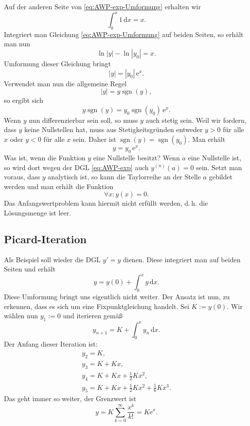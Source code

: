 \documentclass[a4paper,10pt,fleqn,twocolumn,twoside,openany]{article}
\numberwithin{equation}{section}
\newcommand{\ee}{\mathrm e}
\DeclareMathOperator*{\sgn}{sgn}
\theoremstyle{definition}
\begin{document}
Auf der anderen Seite von \eqref{eq:AWP-exp-Umformung} erhalten wir
\begin{equation}
\int_0^x 1\,\mathrm dx = x.
\end{equation}
Integriert man Gleichung \eqref{eq:AWP-exp-Umformung} auf beiden
Seiten, so erhält man nun
\begin{equation}
\ln|y|-\ln|y_0| = x.
\end{equation}
Umformung dieser Gleichung bringt
\begin{equation}
|y| = |y_0|\,\ee^x.
\end{equation}
Verwendet man nun die allgemeine Regel
\begin{equation}
|y|=y\sgn(y),
\end{equation}
so ergibt sich
\begin{equation}
y\sgn(y) = y_0\sgn(y_0)\,\ee^x.
\end{equation}
Wenn $y$ nun differenzierbar sein soll, so muss $y$ auch stetig sein.
Weil wir fordern, dass $y$ keine Nullstellen hat, muss aus
Stetigkeitsgründen entweder $y>0$ für alle $x$ oder $y<0$ für alle
$x$ sein. Daher ist $\sgn(y)=\sgn(y_0)$. Man erhält
\begin{equation}
y = y_0\,\ee^x.
\end{equation}
Was ist, wenn die Funktion $y$ eine Nullstelle besitzt? Wenn $a$
eine Nullstelle ist, so wird dort wegen der DGL \eqref{eq:AWP-exp}
auch $y^{(n)}(a)=0$ sein. Setzt man voraus, dass $y$ analytisch ist,
so kann die Taylorreihe an der Stelle $a$ gebildet werden und man
erhält die Funktion
\begin{equation}
\forall x\colon y(x)=0.
\end{equation}
Das Anfangswertproblem kann hiermit nicht erfüllt werden, d.\,h.
die Lösungsmenge ist leer.

\subsection{Picard-Iteration}

Als Beispiel soll wieder die DGL $y'=y$ dienen.
Diese integriert man auf beiden Seiten und erhält
\begin{equation}
y=y(0)+\int_0^x y\,\mathrm dx.
\end{equation}
Diese Umformung bringt uns eigentlich nicht weiter.
Der Ansatz ist nun, zu erkennen, dass es sich um eine
Fixpunktgleichung handelt. Sei $K:=y(0)$.
Wir wählen nun $y_1:=0$ und iterieren gemäß
\begin{equation}
y_{n+1} = K+\int_0^x y_n\,\mathrm dx.
\end{equation}
Der Anfang dieser Iteration ist:
\begin{gather}
y_2 = K,\\
y_3 = K+Kx,\\
y_4 = K+Kx+\frac{1}{2}Kx^2,\\
y_5 = K+Kx+\frac{1}{2}Kx^2+\frac{1}{6}Kx^3.
\end{gather}
Das geht immer so weiter, der Grenzwert ist
\begin{equation}
y = K\sum_{k=0}^{\infty} \frac{x^k}{k!} = K\ee^x.
\end{equation}
\end{document}
